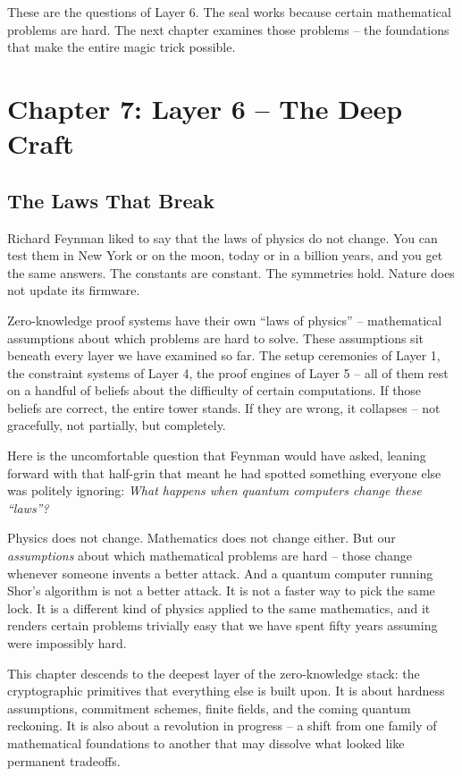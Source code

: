 \documentclass[
  11pt,
  openany]{report}
\begin{document}
These are the questions of Layer 6. The seal works because certain mathematical
problems are hard. The next chapter examines those problems -- the foundations
that make the entire magic trick possible.

\chapter{Chapter 7: Layer 6 -- The Deep
Craft}\label{chapter-7-layer-6-the-deep-craft}

\section{The Laws That Break}\label{the-laws-that-break}

Richard Feynman liked to say that the laws of physics do not change. You can
test them in New York or on the moon, today or in a billion years, and you get
the same answers. The constants are constant. The symmetries hold. Nature does
not update its firmware.

Zero-knowledge proof systems have their own ``laws of physics'' -- mathematical
assumptions about which problems are hard to solve. These assumptions sit
beneath every layer we have examined so far. The setup ceremonies of Layer 1,
the constraint systems of Layer 4, the proof engines of Layer 5 -- all of them
rest on a handful of beliefs about the difficulty of certain computations. If
those beliefs are correct, the entire tower stands. If they are wrong, it
collapses -- not gracefully, not partially, but completely.

Here is the uncomfortable question that Feynman would have asked, leaning
forward with that half-grin that meant he had spotted something everyone else
was politely ignoring: \emph{What happens when quantum computers change these
``laws''?}

Physics does not change. Mathematics does not change either. But our
\emph{assumptions} about which mathematical problems are hard -- those change
whenever someone invents a better attack. And a quantum computer running Shor's
algorithm is not a better attack. It is not a faster way to pick the same lock.
It is a different kind of physics applied to the same mathematics, and it
renders certain problems trivially easy that we have spent fifty years assuming
were impossibly hard.

This chapter descends to the deepest layer of the zero-knowledge stack: the
cryptographic primitives that everything else is built upon. It is about
hardness assumptions, commitment schemes, finite fields, and the coming quantum
reckoning. It is also about a revolution in progress -- a shift from one family
of mathematical foundations to another that may dissolve what looked like
permanent tradeoffs.
\end{document}
